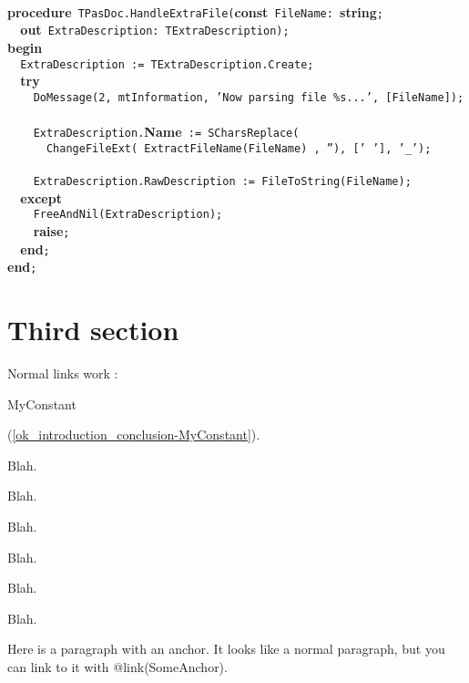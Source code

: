 \documentclass{report}
\begin{document}
\texttt{\\\nopagebreak[3]
}\textbf{procedure}\texttt{~TPasDoc.HandleExtraFile(}\textbf{const}\texttt{~FileName:~}\textbf{string}\texttt{;\\\nopagebreak[3]
~~}\textbf{out}\texttt{~ExtraDescription:~TExtraDescription);\\\nopagebreak[3]
}\textbf{begin}\texttt{\\\nopagebreak[3]
~~ExtraDescription~:=~TExtraDescription.Create;\\\nopagebreak[3]
~~}\textbf{try}\texttt{\\\nopagebreak[3]
~~~~DoMessage(2,~mtInformation,~'Now~parsing~file~{\%}s...',~[FileName]);\\\nopagebreak[3]
\\\nopagebreak[3]
~~~~ExtraDescription.}\textbf{Name}\texttt{~:=~SCharsReplace(\\\nopagebreak[3]
~~~~~~ChangeFileExt(~ExtractFileName(FileName)~,~''),~['~'],~'{\_}');\\\nopagebreak[3]
\\\nopagebreak[3]
~~~~ExtraDescription.RawDescription~:=~FileToString(FileName);\\\nopagebreak[3]
~~}\textbf{except}\texttt{\\\nopagebreak[3]
~~~~FreeAndNil(ExtraDescription);\\\nopagebreak[3]
~~~~}\textbf{raise}\texttt{;\\\nopagebreak[3]
~~}\textbf{end}\texttt{;\\\nopagebreak[3]
}\textbf{end}\texttt{;\\
}

\label{ThirdSecond}
\section{Third section}


Normal links work : \begin{ttfamily}MyConstant\end{ttfamily}(\ref{ok_introduction_conclusion-MyConstant}).

Blah.

Blah.

Blah.

Blah.

Blah.

Blah.

\label{SomeAnchor}
 Here is a paragraph with an anchor. It looks like a normal paragraph, but you can link to it with @link(SomeAnchor).
\end{document}
